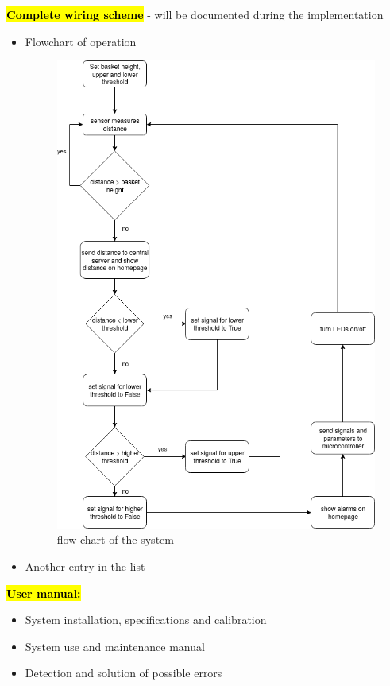 \documentclass{article}
\begin{document}
\textcolor{red}{\textbf{\hl{Complete wiring scheme }}} - will be documented
during the implementation
\begin{itemize}
\item Flowchart of operation
	\begin{figure}[h]
		\center \includegraphics[scale=0.6]{flowChart.png}
		\caption{flow chart of the system}
		\label{sensorWithArduino}
	\end{figure}
\item Another entry in the list
	
\end{itemize}

\textcolor{red}{\textbf{\hl{User manual:}}}
\begin{itemize}
\item System installation, specifications and calibration
\item System use and maintenance manual
\item Detection and solution of possible errors
\end{itemize}
\end{document}
